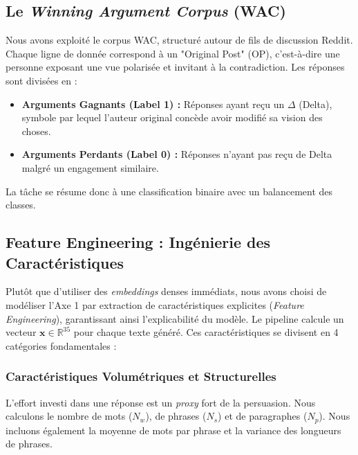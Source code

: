 \documentclass[11pt,a4paper]{article}
\begin{document}
\subsection{Le \textit{Winning Argument Corpus} (WAC)}
Nous avons exploité le corpus WAC, structuré autour de fils de discussion Reddit. Chaque ligne de donnée correspond à un "Original Post" (OP), c'est-à-dire une personne exposant une vue polarisée et invitant à la contradiction. Les réponses sont divisées en :
\begin{itemize}
    \item \textbf{Arguments Gagnants (Label 1) :} Réponses ayant reçu un $\Delta$ (Delta), symbole par lequel l'auteur original concède avoir modifié sa vision des choses.
    \item \textbf{Arguments Perdants (Label 0) :} Réponses n'ayant pas reçu de Delta malgré un engagement similaire.
\end{itemize}
La tâche se résume donc à une classification binaire avec un balancement des classes.

\subsection{Feature Engineering : Ingénierie des Caractéristiques}
Plutôt que d'utiliser des \textit{embeddings} denses immédiats, nous avons choisi de modéliser l'Axe 1 par extraction de caractéristiques explicites (\textit{Feature Engineering}), garantissant ainsi l'explicabilité du modèle. Le pipeline calcule un vecteur $\mathbf{x} \in \mathbb{R}^{35}$ pour chaque texte généré. Ces caractéristiques se divisent en 4 catégories fondamentales :

\subsubsection{Caractéristiques Volumétriques et Structurelles}
L'effort investi dans une réponse est un \textit{proxy} fort de la persuasion. Nous calculons le nombre de mots ($N_w$), de phrases ($N_s$) et de paragraphes ($N_p$). Nous incluons également la moyenne de mots par phrase et la variance des longueurs de phrases.
\end{document}
